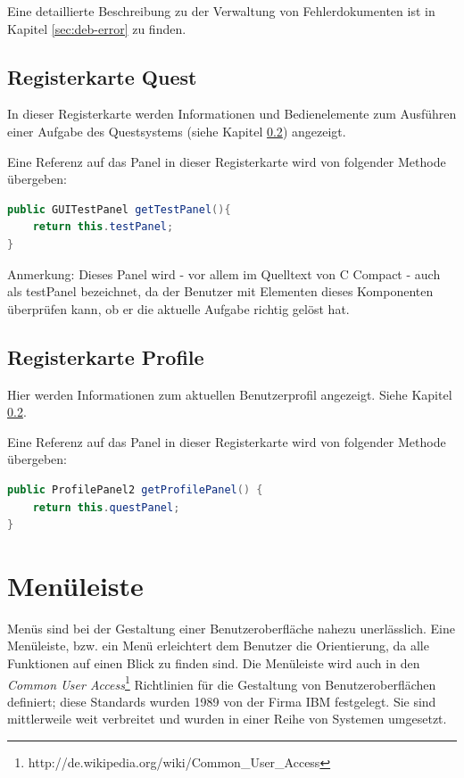 Eine detaillierte Beschreibung zu der Verwaltung von Fehlerdokumenten ist in Kapitel \ref{sec:deb-error} zu finden.

\subsection{Registerkarte \glqq{}Quest\grqq{}}
In dieser Registerkarte werden Informationen und Bedienelemente zum Ausführen einer Aufgabe des Questsystems (siehe Kapitel \ref{}) angezeigt.

Eine Referenz auf das Panel in dieser Registerkarte wird von folgender Methode übergeben:
\begin{lstlisting}[language=JAVA]
public GUITestPanel getTestPanel(){
	return this.testPanel;
}
\end{lstlisting}

Anmerkung: Dieses Panel wird - vor allem im Quelltext von C Compact - auch als \glqq{}testPanel\grqq{} bezeichnet, da der Benutzer mit Elementen dieses Komponenten überprüfen kann, ob er die aktuelle Aufgabe richtig gelöst hat.

\subsection{Registerkarte \glqq{}Profile\grqq{}}
Hier werden Informationen zum aktuellen Benutzerprofil angezeigt. Siehe Kapitel \ref{}.

Eine Referenz auf das Panel in dieser Registerkarte wird von folgender Methode übergeben:
\begin{lstlisting}[language=JAVA]
public ProfilePanel2 getProfilePanel() {
	return this.questPanel;
}
\end{lstlisting}



\section{Menüleiste}
\label{sec:gui-main-menu}
Menüs sind bei der Gestaltung einer Benutzeroberfläche nahezu unerlässlich. Eine Menüleiste, bzw. ein Menü erleichtert dem Benutzer die Orientierung, da alle Funktionen auf einen Blick zu finden sind. Die Menüleiste wird auch in den \emph{Common User Access}\footnote{http://de.wikipedia.org/wiki/Common\_User\_Access} Richtlinien für die Gestaltung von Benutzeroberflächen definiert; diese Standards wurden 1989 von der Firma IBM festgelegt. Sie sind mittlerweile weit verbreitet und wurden in einer Reihe von Systemen umgesetzt.

